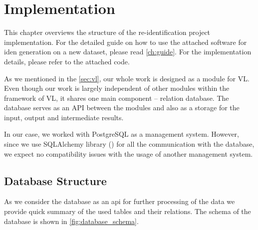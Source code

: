 \chapter{Implementation}

\label{ch:implementation}

This chapter overviews the structure of the re-identification project implementation. For the detailed guide on how to use the attached software for \gls{iden} generation on a new dataset, please read \autoref{ch:guide}. For the implementation details, please refer to the attached code.

As we mentioned in the \autoref{sec:vl}, our whole work is designed as a module for \gls{VL}. Even though our work is largely independent of other modules within the framework of \gls{VL}, it shares one main component -- relation database. The database serves as an API between the modules and also as a storage for the input, output and intermediate results.

In our case, we worked with PostgreSQL as a management system. However, since we use SQLAlchemy library (\cite{sqlalchemy}) for all the communication with the database, we expect no compatibility issues with the usage of another management system.

\section{Database Structure}
\label{sec:db_structure}

As we consider the database as an \gls{api} for further processing of the data we provide quick summary of the used tables and their relations. The schema of the database is shown in \autoref{fig:database_schema}.

